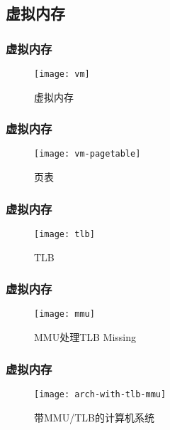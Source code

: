 \subsection{虚拟内存}

\begin{frame}[plain]
	
	\frametitle{虚拟内存}
	
	\begin{figure}
		\centering
		\texttt{[image: vm]}
		\caption{虚拟内存}
	\end{figure}
	
\end{frame}

\begin{frame}[plain]
	
	\frametitle{虚拟内存}
	
	\begin{figure}
		\centering
		\texttt{[image: vm-pagetable]}
		\caption{页表}
	\end{figure}
	
\end{frame}

\begin{frame}
	
	\frametitle{虚拟内存}
	
	\begin{figure}
		\centering
		\texttt{[image: tlb]}
		\caption{TLB}
	\end{figure}
	
\end{frame}

\begin{frame}[plain]
	
	\frametitle{虚拟内存}
	
	\begin{figure}
		\centering
		\texttt{[image: mmu]}
		\caption{MMU处理TLB Missing}
	\end{figure}
	
\end{frame}

\begin{frame}[plain]
	
	\frametitle{虚拟内存}
	
	\begin{figure}
		\centering
		\texttt{[image: arch-with-tlb-mmu]}
		\caption{带MMU/TLB的计算机系统}
	\end{figure}
	
\end{frame}

